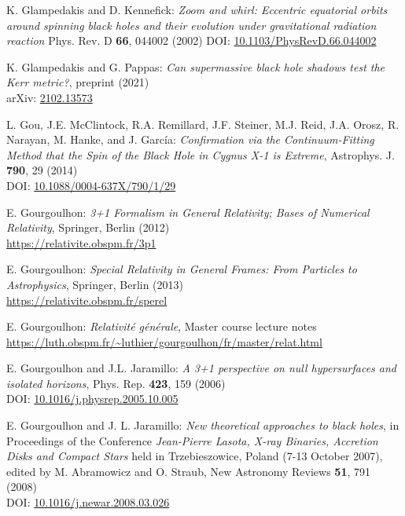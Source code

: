 \begin{thebibliography}{123}
K. Glampedakis and D. Kennefick:
{\em Zoom and whirl: Eccentric equatorial orbits around spinning black holes and their evolution under gravitational radiation reaction}
Phys. Rev. D {\bf 66}, 044002 (2002)
DOI: \href{https://doi.org/10.1103/PhysRevD.66.044002}{10.1103/PhysRevD.66.044002}

K. Glampedakis and G. Pappas:
{\em Can supermassive black hole shadows test the Kerr metric?},
preprint (2021)\\
arXiv: \href{https://arxiv.org/abs/2102.13573}{2102.13573}

L. Gou, J.E. McClintock, R.A. Remillard, J.F. Steiner, M.J. Reid, J.A. Orosz, R. Narayan, M. Hanke, and J. García:
{\em Confirmation via the Continuum-Fitting Method that the Spin of the Black Hole in Cygnus X-1 is Extreme},
Astrophys. J. {\bf 790}, 29 (2014)\\
DOI: \href{https://doi.org/10.1088/0004-637X/790/1/29}{10.1088/0004-637X/790/1/29}

E. Gourgoulhon: {\em 3+1 Formalism in General Relativity; Bases of Numerical Relativity},
Springer, Berlin (2012)\\
\url{https://relativite.obspm.fr/3p1}

E. Gourgoulhon: {\em Special Relativity in General Frames: From Particles to Astrophysics},
Springer, Berlin (2013) \\
\url{https://relativite.obspm.fr/sperel}

E. Gourgoulhon: {\em Relativit\'e g\'en\'erale},
Master course lecture notes\\
\url{https://luth.obspm.fr/~luthier/gourgoulhon/fr/master/relat.html}

E. Gourgoulhon and J.L. Jaramillo: {\em A 3+1 perspective on null hypersurfaces and isolated horizons},
Phys. Rep. {\bf 423}, 159 (2006)\\
DOI: \href{https://doi.org/10.1016/j.physrep.2005.10.005}{10.1016/j.physrep.2005.10.005}

E. Gourgoulhon and J. L. Jaramillo: {\em New theoretical approaches to black holes},
in Proceedings of the Conference {\em Jean-Pierre Lasota, X-ray Binaries, Accretion Disks and Compact Stars} held in Trzebieszowice, Poland (7-13 October 2007), edited by M. Abramowicz and O. Straub, New Astronomy Reviews {\bf 51}, 791 (2008) \\
DOI: \href{https://doi.org/10.1016/j.newar.2008.03.026}{10.1016/j.newar.2008.03.026}


\end{thebibliography}

